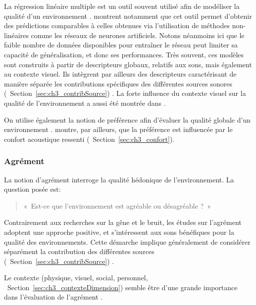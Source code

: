 La régression linéaire multiple est un outil souvent utilisé afin de modéliser la qualité d'un environnement \citep{ricciardi2015sound}. \citep{brocolini2012prediction} montrent notamment que cet outil permet d'obtenir des prédictions comparables à celles obtenues via l'utilisation de méthodes non-linéaires comme les réseaux de neurones artificiels. Notons néanmoins ici que le faible nombre de données disponibles pour entraîner le réseau peut limiter sa capacité de généralisation, et donc ses performances. Très souvent, ces modèles sont construits à partir de descripteurs globaux, relatifs aux sons, mais également au contexte visuel. Ils intègrent par ailleurs des descripteurs caractérisant de manière séparée les contributions spécifiques des différentes sources sonores (\cf~Section~\ref{sec:ch3_contribSource}) \citep{ricciardi2015sound,brocolini2012prediction}. La forte influence du contexte visuel sur la qualité de l'environnement a aussi été montrée dans \citep{hong2013designing}.

On utilise également la notion de préférence afin d'évaluer la qualité globale d'un environnement \citep{yu2010factors}. \citep{hong2013designing} montre, par ailleurs, que la préférence est influencée par le confort acoustique ressenti (\cf~Section~\ref{sec:ch3_confort}).\\



\subsubsection{Agrément}

La notion d'agrément interroge la qualité hédonique de l'environnement. La question posée est:

\begin{quote}
«~Est-ce que l'environnement est agréable ou désagréable ?~»
\end{quote}
 
Contrairement aux recherches sur la gêne et le bruit, les études sur l'agrément adoptent une approche positive, et s'intéressent aux sons bénéfiques pour la qualité des environnements. Cette démarche implique généralement de considérer séparément la contribution des différentes sources (\cf~Section~\ref{sec:ch3_contribSource}) \citep{lavandier2006contribution,garcia2012validation}.

Le contexte (physique, visuel, social, personnel, \cf~Section~\ref{sec:ch3_contexteDimension}) semble être d'une grande importance dans l'évaluation de l'agrément \citep{guillen2007importance}.


